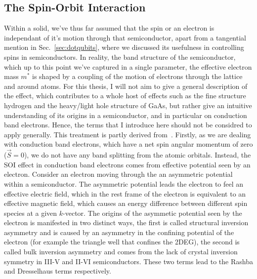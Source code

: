 \subsection{The Spin-Orbit Interaction}
\label{sec:SOI}
Within a solid, we've thus far assumed that the spin or an electron is independant of it's motion through that semiconductor, apart from
a tangential mention in Sec.~\ref{sec:dotqubits}, where we discussed its usefulness in controlling spins in semiconductors. In reality, the
band structure of the semiconductor, which up to this point we've captured in a single parameter, the effective electron mass $m^*$ is shaped
by a coupling of the motion of electrons through the lattice and around atoms. For this thesis, I will not aim to give a general description of
the effect, which contributes to a whole host of effects such as the fine structure hydrogen and the heavy/light hole structure of GaAs,
but rather give an intuitive understanding of its origins in a semiconductor, and in particular on conduction band electrons. Hence, the terms that
I introduce here should not be considred to apply generally. This treatment is partly derived from~\cite{winkler2003spin,dyakonov2017spin}.
Firstly, as we are dealing with conduction band electrons, which have a net spin angular momentum of
zero ($\vec S = 0$), we do not have any band splitting from the atomic orbitals. Instead, the SOI effect in conduction band electrons comes from effective
potential seen by an electron. Consider an electron moving through the an asymmetric potential within a semiconductor. The asymmetric potential leads the
electron to feel an effective electric field, which in the rest frame of the electron is equivalent to an effective magnetic field, which causes an energy difference
between different spin species at a given $k$-vector. The origins of the asymmetic potential seen by the electron is manifested in two distinct ways,
the first is called structural inversion asymmetry and is caused by an asymmetry in the confining potential of the electron (for example the triangle
well that confines the 2DEG), the second is called bulk inversion asymmetry and comes from the lack of crystal inversion symmetry in III-V and II-VI semiconductors. These
two terms lead to the Rashba and Dresselhaus terms respectively.

